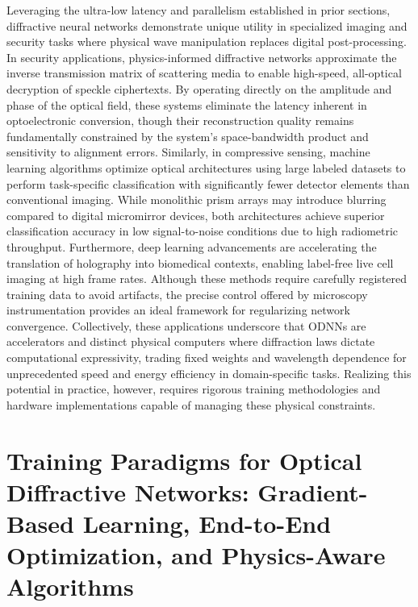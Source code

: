 Leveraging the ultra-low latency and parallelism established in prior sections, diffractive neural networks demonstrate unique utility in specialized imaging and security tasks where physical wave manipulation replaces digital post-processing. In security applications, physics-informed diffractive networks approximate the inverse transmission matrix of scattering media to enable high-speed, all-optical decryption of speckle ciphertexts. By operating directly on the amplitude and phase of the optical field, these systems eliminate the latency inherent in optoelectronic conversion, though their reconstruction quality remains fundamentally constrained by the system's space-bandwidth product and sensitivity to alignment errors. Similarly, in compressive sensing, machine learning algorithms optimize optical architectures using large labeled datasets to perform task-specific classification with significantly fewer detector elements than conventional imaging. While monolithic prism arrays may introduce blurring compared to digital micromirror devices, both architectures achieve superior classification accuracy in low signal-to-noise conditions due to high radiometric throughput. Furthermore, deep learning advancements are accelerating the translation of holography into biomedical contexts, enabling label-free live cell imaging at high frame rates. Although these methods require carefully registered training data to avoid artifacts, the precise control offered by microscopy instrumentation provides an ideal framework for regularizing network convergence. Collectively, these applications underscore that ODNNs are accelerators and distinct physical computers where diffraction laws dictate computational expressivity, trading fixed weights and wavelength dependence for unprecedented speed and energy efficiency in domain-specific tasks. Realizing this potential in practice, however, requires rigorous training methodologies and hardware implementations capable of managing these physical constraints. \citep{doi_10_1117_1_apn_5_1_016010_3e30c230} \citep{doi_10_1117_1_oe_59_5_051404_363a991a} \citep{doi_10_1038_s41377_019_0196_0_c541a42e}

\section{Training Paradigms for Optical Diffractive Networks: Gradient-Based Learning, End-to-End Optimization, and Physics-Aware Algorithms}\label{training-paradigms-for-optical-diffractive-networks-gradient-based-learning-end-to-end-optimization-and-physics-aware-algorithms}

